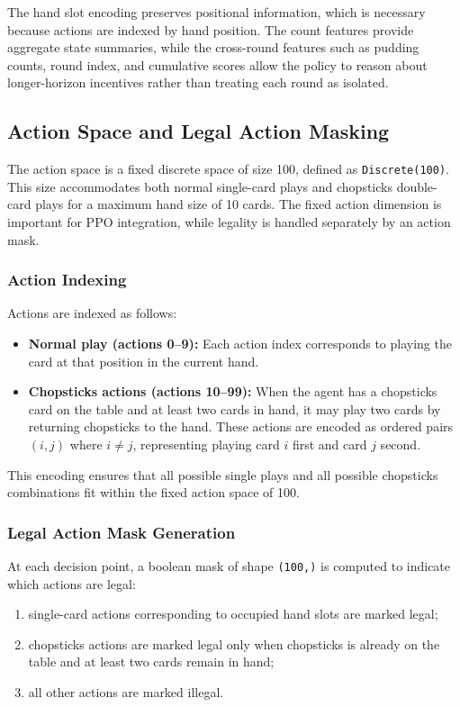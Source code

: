 \documentclass[10pt]{article}
\begin{document}
The hand slot encoding preserves positional information, which is necessary because actions are indexed by hand position. The count features provide aggregate state summaries, while the cross-round features such as pudding counts, round index, and cumulative scores allow the policy to reason about longer-horizon incentives rather than treating each round as isolated.

\subsection{Action Space and Legal Action Masking}

The action space is a fixed discrete space of size 100, defined as \texttt{Discrete(100)}. This size accommodates both normal single-card plays and chopsticks double-card plays for a maximum hand size of 10 cards. The fixed action dimension is important for PPO integration, while legality is handled separately by an action mask.

\subsubsection{Action Indexing}

Actions are indexed as follows:
\begin{itemize}
  \item \textbf{Normal play (actions 0--9):} Each action index corresponds to playing the card at that position in the current hand.
  \item \textbf{Chopsticks actions (actions 10--99):} When the agent has a chopsticks card on the table and at least two cards in hand, it may play two cards by returning chopsticks to the hand. These actions are encoded as ordered pairs \((i,j)\) where \(i \neq j\), representing playing card \(i\) first and card \(j\) second.
\end{itemize}

This encoding ensures that all possible single plays and all possible chopsticks combinations fit within the fixed action space of 100.

\subsubsection{Legal Action Mask Generation}

At each decision point, a boolean mask of shape \texttt{(100,)} is computed to indicate which actions are legal:
\begin{enumerate}
  \item single-card actions corresponding to occupied hand slots are marked legal;
  \item chopsticks actions are marked legal only when chopsticks is already on the table and at least two cards remain in hand;
  \item all other actions are marked illegal.
\end{enumerate}
\end{document}

